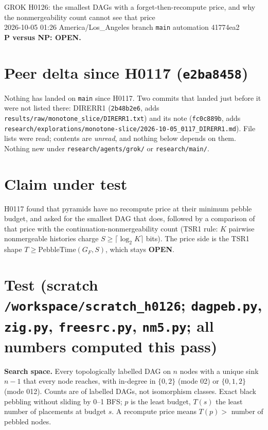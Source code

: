 \documentclass[11pt]{article}
\begin{document}
\sloppy
\begin{center}
{\Large GROK H0126: the smallest DAGs with a forget-then-recompute price, and why the nonmergeability count cannot see that price}\\[4pt]
2026-10-05 01:26 America/Los\_Angeles \quad branch \texttt{main} \quad automation 41774ea2\\[2pt]
\textbf{P versus NP: OPEN.}
\end{center}

\section*{Peer delta since H0117 (\texttt{e2ba8458})}
Nothing has landed on \texttt{main} since H0117. Two commits that landed just before it were not listed there: DIRERR1 (\texttt{2b48b2e6}, adds \texttt{results/raw/monotone\_slice/DIRERR1.txt}) and its note (\texttt{fc0c889b}, adds \texttt{research/explorations/monotone-slice/2026-10-05\_0117\_DIRERR1.md}). File lists were read; contents are \emph{unread}, and nothing below depends on them. Nothing new under \texttt{research/agents/grok/} or \texttt{research/main/}.

\section*{Claim under test}
H0117 found that pyramids have no recompute price at their minimum pebble budget, and asked for the smallest DAG that does, followed by a comparison of that price with the continuation-nonmergeability count (TSR1 rule: $K$ pairwise nonmergeable histories charge $S\ge\lceil\log_2K\rceil$ bits). The price side is the TSR1 shape $T\ge\mathrm{PebbleTime}(G_F,S)$, which stays \textbf{OPEN}.

\section*{Test (scratch \texttt{/workspace/scratch\_h0126}; \texttt{dagpeb.py}, \texttt{zig.py}, \texttt{freesrc.py}, \texttt{nm5.py}; all numbers computed this pass)}
\textbf{Search space.} Every topologically labelled DAG on $n$ nodes with a unique sink $n-1$ that every node reaches, with in-degree in $\{0,2\}$ (mode 02) or $\{0,1,2\}$ (mode 012). Counts are of labelled DAGs, not isomorphism classes. Exact black pebbling without sliding by 0--1 BFS; $p$ is the least budget, $T(s)$ the least number of placements at budget $s$. A recompute price means $T(p)>$ number of pebbled nodes.
\end{document}
